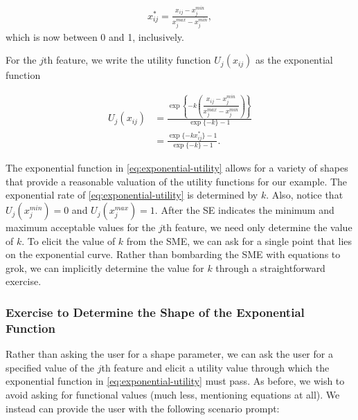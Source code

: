 \documentclass{article}
\begin{document}
\begin{align*}
  x_{ij}^{*} = \frac{x_{ij} - x_j^{min}}{x_j^{max} - x_j^{min}},
\end{align*}
which is now between 0 and 1, inclusively.

For the $j$th feature, we write the utility function $U_{j}(x_{ij})$ as the
exponential function

\begin{align}
  U_{j}(x_{ij}) &= \frac{\exp\left\{-k \left(\dfrac{x_{ij} - x_j^{min}}{x_j^{max} - x_j^{min}}\right)\right\}}{\exp\{-k\} - 1}\nonumber\\
  &= \frac{\exp\{-k x_{ij}^{*}\} - 1}{\exp\{-k\} - 1}.\label{eq:exponential-utility}
\end{align}

The exponential function in \eqref{eq:exponential-utility} allows for a variety
of shapes that provide a reasonable valuation of the utility functions for our
example. The exponential rate of \eqref{eq:exponential-utility} is determined by
$k$. Also, notice that $U_j(x_j^{min}) = 0$ and $U_j(x_j^{max}) = 1$. After
the SE indicates the minimum and maximum acceptable values for the $j$th
feature, we need only determine the value of $k$. To elicit the value of $k$ from
the SME, we can ask for a single point that lies on the exponential curve. Rather
than bombarding the SME with equations to grok, we can implicitly determine the
value for $k$ through a straightforward exercise.

\subsubsection{Exercise to Determine the Shape of the Exponential Function}

Rather than asking the user for a shape parameter, we can ask the user for a
specified value of the $j$th feature and elicit a utility value through which
the exponential function in \eqref{eq:exponential-utility} must pass. As before,
we wish to avoid asking for functional values (much less, mentioning equations
at all). We instead can provide the user with the following scenario prompt:
\end{document}
